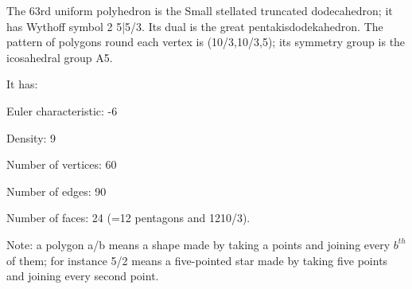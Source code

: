The 63rd uniform polyhedron is the Small stellated truncated dodecahedron; it has Wythoff symbol 2 5|5/3. Its dual is the great pentakisdodekahedron. The pattern of polygons round each vertex is (10/3,10/3,5); its symmetry group is the icosahedral group A5.\par
It has:\par
Euler characteristic: -6\par
Density: 9\par
Number of vertices: 60\par
Number of edges:  90\par
Number of faces: 24 (=12 pentagons and 12{10/3}).\par
Note: a polygon a/b means a shape made by taking a points and joining every $b^{th}$  of them; for instance 5/2 means a five-pointed star made by taking five points and joining every second point.